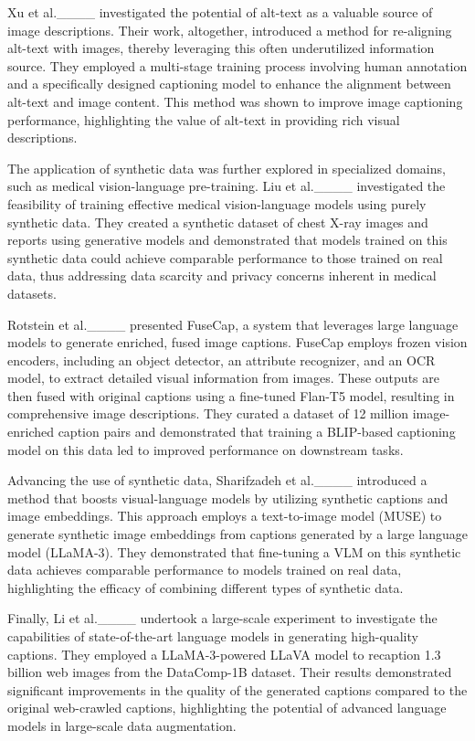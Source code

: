 Xu et al.____ investigated the potential of alt-text as a valuable source of image descriptions. Their work, altogether, introduced a method for re-aligning alt-text with images, thereby leveraging this often underutilized information source. They employed a multi-stage training process involving human annotation and a specifically designed captioning model to enhance the alignment between alt-text and image content. This method was shown to improve image captioning performance, highlighting the value of alt-text in providing rich visual descriptions.

The application of synthetic data was further explored in specialized domains, such as medical vision-language pre-training. Liu et al.____ investigated the feasibility of training effective medical vision-language models using purely synthetic data. They created a synthetic dataset of chest X-ray images and reports using generative models and demonstrated that models trained on this synthetic data could achieve comparable performance to those trained on real data, thus addressing data scarcity and privacy concerns inherent in medical datasets.

Rotstein et al.____ presented FuseCap, a system that leverages large language models to generate enriched, fused image captions. FuseCap employs frozen vision encoders, including an object detector, an attribute recognizer, and an OCR model, to extract detailed visual information from images. These outputs are then fused with original captions using a fine-tuned Flan-T5 model, resulting in comprehensive image descriptions. They curated a dataset of 12 million image-enriched caption pairs and demonstrated that training a BLIP-based captioning model on this data led to improved performance on downstream tasks.

Advancing the use of synthetic data, Sharifzadeh et al.____ introduced a method that boosts visual-language models by utilizing synthetic captions and image embeddings. This approach employs a text-to-image model (MUSE) to generate synthetic image embeddings from captions generated by a large language model (LLaMA-3). They demonstrated that fine-tuning a VLM on this synthetic data achieves comparable performance to models trained on real data, highlighting the efficacy of combining different types of synthetic data.

Finally, Li et al.____ undertook a large-scale experiment to investigate the capabilities of state-of-the-art language models in generating high-quality captions. They employed a LLaMA-3-powered LLaVA model to recaption 1.3 billion web images from the DataComp-1B dataset. Their results demonstrated significant improvements in the quality of the generated captions compared to the original web-crawled captions, highlighting the potential of advanced language models in large-scale data augmentation.

